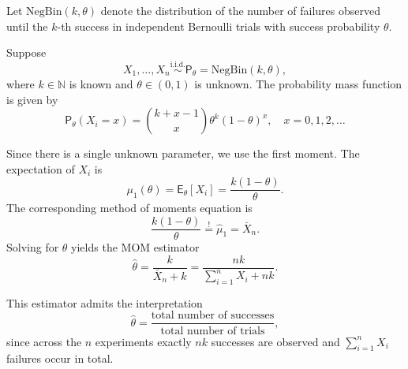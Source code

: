 \begin{ex}
    \label{ex:nbm}
Let \(\mathrm{NegBin}(k,\theta)\) denote the distribution of the number of
failures observed until the \(k\)-th success in independent Bernoulli trials
with success probability \(\theta\).

Suppose
\[
X_1, \dots, X_n \overset{\text{i.i.d.}}{\sim} \mathsf{P}_\theta
= \mathrm{NegBin}(k,\theta),
\]
where \(k \in \mathbb{N}\) is known and \(\theta \in (0,1)\) is unknown. The
probability mass function is given by
\[
\mathsf{P}_\theta(X_i = x)
= \binom{k + x - 1}{x} \theta^k (1 - \theta)^x,
\quad x = 0,1,2,\dots
\]

Since there is a single unknown parameter, we use the first moment. The
expectation of \(X_i\) is
\[
\mu_1(\theta) = \mathsf{E}_\theta[X_i]
= \frac{k(1 - \theta)}{\theta}.
\]
The corresponding method of moments equation is
\[
\frac{k(1 - \theta)}{\theta}
\overset{!}{=}
\hat\mu_1
= \bar X_n.
\]
Solving for \(\theta\) yields the MOM estimator
\[
\hat\theta
= \frac{k}{\bar X_n + k}
= \frac{nk}{\sum_{i=1}^n X_i + nk}.
\]

This estimator admits the interpretation
\[
\hat\theta
= \frac{\text{total number of successes}}
       {\text{total number of trials}},
\]
since across the \(n\) experiments exactly \(nk\) successes are observed and
\(\sum_{i=1}^n X_i\) failures occur in total.
\end{ex}


